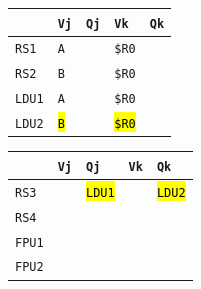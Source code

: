 \begin{enumerate}
    \begin{minipage}{0.45\textwidth}
        \centering
        \begin{tabular}{@{} l | l l l l @{}}
            \toprule
                & \texttt{Vj} & \texttt{Qj} & \texttt{Vk} & \texttt{Qk} \\
            \midrule
            \texttt{RS1} & \texttt{A} & & \texttt{\$R0} & \\ [.3em]
            \texttt{RS2} & \texttt{B} & & \texttt{\$R0} & \\
            \cmidrule{1-5}
            \texttt{LDU1} & \texttt{A} & & \texttt{\$R0} & \\ [.3em]
            \texttt{LDU2} & \hl{\texttt{B}} & & \hl{\texttt{\$R0}} & \\
            \bottomrule
        \end{tabular}
    \end{minipage}
    \hfill
    \begin{minipage}{0.45\textwidth}
        \centering
        \begin{tabular}{@{} l | l l l l @{}}
            \toprule
            & \texttt{Vj} & \texttt{Qj} & \texttt{Vk} & \texttt{Qk} \\
            \midrule
            \texttt{RS3} & & \hl{\texttt{LDU1}} & & \hl{\texttt{LDU2}} \\ [.3em]
            \texttt{RS4} & & & & \\
            \cmidrule{1-5}
            \texttt{FPU1} & & & & \\ [.3em]
            \texttt{FPU2} & & & & \\
            \bottomrule
        \end{tabular}
    \end{minipage}


\end{enumerate}
